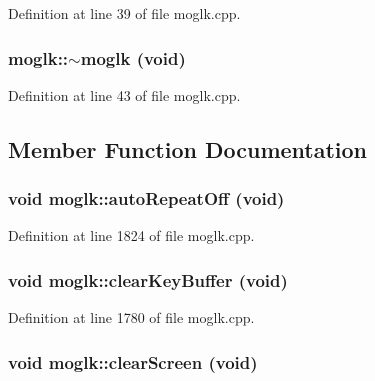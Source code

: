Definition at line 39 of file moglk.cpp.\hypertarget{classmoglk_19ba0cf0910a364b32685b1806a98773}{
\subsubsection[{$\sim$moglk}]{\setlength{\rightskip}{0pt plus 5cm}moglk::$\sim$moglk (void)}}
\label{classmoglk_19ba0cf0910a364b32685b1806a98773}




Definition at line 43 of file moglk.cpp.

\subsection{Member Function Documentation}
\hypertarget{classmoglk_cbeba932b129751d3980fccf9f462ef0}{
\subsubsection[{autoRepeatOff}]{\setlength{\rightskip}{0pt plus 5cm}void moglk::autoRepeatOff (void)}}
\label{classmoglk_cbeba932b129751d3980fccf9f462ef0}




Definition at line 1824 of file moglk.cpp.\hypertarget{classmoglk_cf2b77285c9281037e194508041c1409}{
\subsubsection[{clearKeyBuffer}]{\setlength{\rightskip}{0pt plus 5cm}void moglk::clearKeyBuffer (void)}}
\label{classmoglk_cf2b77285c9281037e194508041c1409}




Definition at line 1780 of file moglk.cpp.\hypertarget{classmoglk_40044034e8cb0e4caa5c240865ab5b35}{
\subsubsection[{clearScreen}]{\setlength{\rightskip}{0pt plus 5cm}void moglk::clearScreen (void)}}
\label{classmoglk_40044034e8cb0e4caa5c240865ab5b35}





